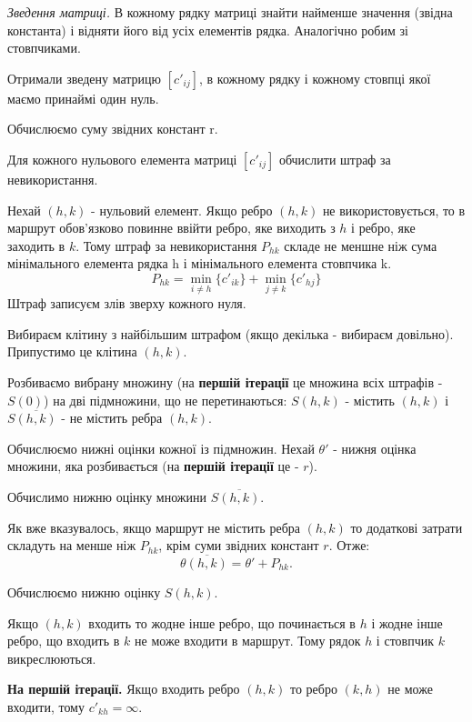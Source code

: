 \documentclass[12pt,a4paper]{book}
\newenvironment{slim_enumerate}{
\begin{enumerate}
  \setlength{\itemsep}{1pt}
  \setlength{\parskip}{0pt}
  \setlength{\parsep}{0pt}}
{\end{enumerate}}
\begin{document}
\begin{slim_enumerate}
  \item {\it Зведення матриці.} В кожному рядку матриці знайти найменше значення (звідна константа) і відняти його від усіх елементів рядка. Аналогічно робим зі стовпчиками.

Отримали зведену матрицю $[c'_{ij}]$, в кожному рядку і кожному стовпці якої маємо принаймі один нуль.

Обчислюємо суму звідних констант r.

  \item Для кожного нульового елемента матриці $[c'_{ij}]$ обчислити штраф за невикористання.

Нехай $(h,k)$ - нульовий елемент. Якщо ребро $(h,k)$ не використовується, то в маршрут обов’язково повинне ввійти ребро, яке виходить з $h$ і ребро, яке заходить в $k$. Тому штраф за невикористання $P_{h k}$ складе не меншне ніж сума мінімального елемента рядка h і мінімального елемента стовпчика k.
\[ P_{h k} = \displaystyle\min_{i \neq h}\{c'_{i k}\} + \displaystyle\min_{j \neq k}\{c'_{h j}\} \]
Штраф записуєм злів зверху кожного нуля.

  \item Вибираєм клітину з найбільшим штрафом (якщо декілька - вибираєм довільно). Припустимо це клітина $(h, k)$. 

Розбиваємо вибрану множину (на {\bf першій ітерації} це множина всіх штрафів - $S(0)$) на дві підмножини, що не перетинаються: $S(h,k)$ - містить $(h,k)$ і $S \overline{(h,k)}$ - не містить ребра $(h, k)$.

  \item Обчислюємо нижні оцінки кожної із підмножин. Нехай $\theta'$ - нижня оцінка множини, яка розбивається (на {\bf першій ітерації} це - $r$).
  \begin{slim_enumerate}
    \item Обчислимо нижню оцінку множини $S \overline{(h,k)}$.

Як вже вказувалось, якщо маршрут не містить ребра $(h,k)$ то додаткові затрати складуть на менше ніж $P_{h k}$, крім суми звідних констант $r$. Отже:
\[ \theta \overline{(h,k)} = \theta'+P_{h k}. \]
    \item Обчислюємо нижню оцінку $S(h,k)$.
    \begin{slim_enumerate}
      \item Якщо $(h,k)$ входить то жодне інше ребро, що починається в $h$ і жодне інше ребро, що входить в $k$ не може входити в маршрут. Тому рядок $h$ і стовпчик $k$ викреслюються.
      \item {\bf На першій ітерації.} Якщо входить ребро $(h,k)$ то ребро $(k,h)$ не може входити, тому $c'_{k h} = \infty$.


\end{slim_enumerate}
\end{slim_enumerate}
\end{slim_enumerate}
\end{document}
